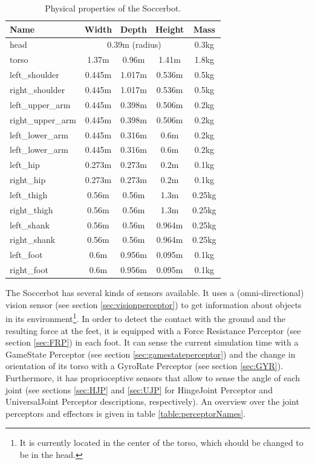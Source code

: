 \begin{table}
\centering
\begin{tabular}[htbp]{|l|c|c|c|c|}
  \hline
  Name & Width & Depth & Height & Mass \\
  \hline\hline
  head & \multicolumn{3}{|c|}{0.39m (radius)} & 0.3kg\\ \hline
  torso & 1.37m & 0.96m & 1.41m & 1.8kg \\ \hline
  left\_shoulder & 0.445m & 1.017m & 0.536m & 0.5kg \\ \hline
  right\_shoulder & 0.445m & 1.017m & 0.536m & 0.5kg \\ \hline
  left\_upper\_arm & 0.445m & 0.398m & 0.506m & 0.2kg \\ \hline
  right\_upper\_arm & 0.445m & 0.398m & 0.506m & 0.2kg \\ \hline
  left\_lower\_arm & 0.445m & 0.316m & 0.6m & 0.2kg \\ \hline
  left\_lower\_arm & 0.445m & 0.316m & 0.6m & 0.2kg \\ \hline
  left\_hip & 0.273m & 0.273m & 0.2m & 0.1kg \\ \hline
  right\_hip & 0.273m & 0.273m & 0.2m & 0.1kg \\ \hline
  left\_thigh & 0.56m & 0.56m & 1.3m & 0.25kg \\ \hline
  right\_thigh & 0.56m & 0.56m & 1.3m & 0.25kg \\ \hline
  left\_shank & 0.56m & 0.56m & 0.964m & 0.25kg \\ \hline
  right\_shank & 0.56m & 0.56m & 0.964m & 0.25kg \\ \hline
  left\_foot & 0.6m & 0.956m & 0.095m & 0.1kg \\ \hline
  right\_foot & 0.6m & 0.956m & 0.095m & 0.1kg \\
  \hline
\end{tabular}
\caption{Physical properties of the Soccerbot.}
\label{table:dimensions}
\end{table}%

The Soccerbot has several kinds of sensors available. It uses a (omni-directional) vision sensor (see section \ref{sec:visionperceptor}) to get information about objects in its environment\footnote{It is currently located in the center of the torso, which should be changed to be in the head.}. In order to detect the contact with the ground and the resulting force at the feet, it is equipped with a Force Resistance Perceptor (see section \ref{sec:FRP}) in each foot. It can sense the current simulation time with a GameState Perceptor (see section \ref{sec:gamestateperceptor}) and the change in orientation of its torso with a GyroRate Perceptor (see section \ref{sec:GYR}). Furthermore, it has proprioceptive sensors that allow to sense the angle of each joint (see sections \ref{sec:HJP} and \ref{sec:UJP} for HingeJoint Perceptor and UniversalJoint Perceptor descriptions, respectively). An overview over the joint perceptors and effectors is given in table \ref{table:perceptorNames}.

